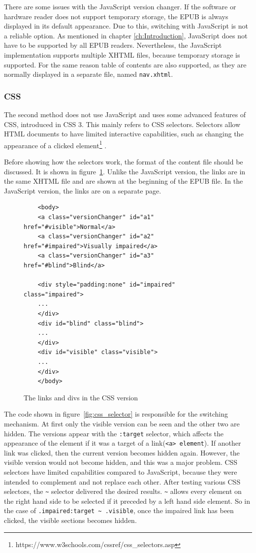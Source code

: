 There are some issues with the JavaScript version changer. If the software or hardware reader does not support temporary storage, the EPUB is always displayed in its default appearance. Due to this, switching with JavaScript is not a reliable option. As mentioned in chapter \ref{ch:Introduction}, JavaScript does not have to be supported by all EPUB readers. Nevertheless, the JavaScript implementation supports multiple XHTML files, because temporary storage is supported. For the same reason table of contents are also supported, as they are normally displayed in a separate file, named \lstinline|nav.xhtml|. 

\subsubsection{CSS}
The second method does not use JavaScript and uses some advanced features of CSS, introduced in CSS 3. This mainly refers to CSS selectors. Selectors allow HTML documents to have limited interactive capabilities, such as changing the appearance of a clicked element\footnote{https://www.w3schools.com/cssref/css\_selectors.asp} \cite{cssSelectors}.

Before showing how the selectors work, the format of the content file should be discussed. It is shown in figure~\ref{fig:css_switch}. Unlike the JavaScript version, the links are in the same XHTML file and are shown at the beginning of the EPUB file. In the JavaScript version, the links are on a separate page.


\begin{figure}
	
	\begin{lstlisting}
	<body>
	<a class="versionChanger" id="a1" href="#visible">Normal</a>
	<a class="versionChanger" id="a2" href="#impaired">Visually impaired</a>
	<a class="versionChanger" id="a3" href="#blind">Blind</a>
	
	<div style="padding:none" id="impaired" class="impaired">
	...
	</div>
	<div id="blind" class="blind">
	...
	</div>
	<div id="visible" class="visible">
	...
	</div>
	</body>
	\end{lstlisting}
	\caption{The links and divs in the CSS version}
	\label{fig:css_switch}
\end{figure}

The code shown in figure~\ref{fig:css_selector} is responsible for the switching mechanism. At first only the visible version can be seen and the other two are hidden. The versions appear with the \lstinline|:target| selector, which affects the appearance of the element if it was a target of a link(\lstinline|<a> element|). If another link was clicked, then the current version becomes hidden again. However, the visible version would not become hidden, and this was a major problem. CSS selectors have limited capabilities compared to JavaScript, because they were intended to complement and not replace each other. After testing various CSS selectors, the \lstinline|~| selector delivered the desired results. \lstinline|~| allows every element on the right hand side to be selected if it preceded by a left hand side element. So in the case of \lstinline|.impaired:target ~ .visible|, once the impaired link has been clicked, the visible sections becomes hidden.

